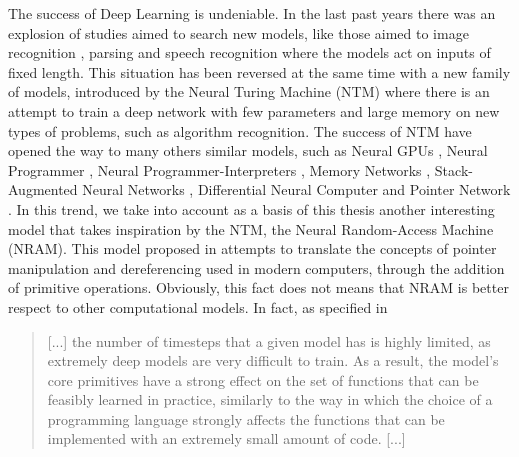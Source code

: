 The success of Deep Learning is undeniable. In the last past years there was an explosion of studies aimed to search new models, like those aimed to image recognition \cite{Krizhevsky2012ImageNetCW}, parsing \cite{Vinyals2015GrammarAA} and speech recognition \cite{Chan2015ListenAA} where the models act on inputs of fixed length. This situation has been reversed at the same time with a new family of models, introduced by the Neural Turing Machine (NTM) \cite{Graves2014NeuralTM} where there is an attempt to train a deep network with few parameters and large memory on new types of problems, such as algorithm recognition. The success of NTM have opened the way to many others similar models, such as Neural GPUs \cite{Kaiser2015NeuralGL}, Neural Programmer \cite{Neelakantan2015NeuralPI}, Neural Programmer-Interpreters \cite{Reed2015NeuralP}, Memory Networks \cite{Weston2014MemoryN}, Stack-Augmented Neural Networks \cite{Joulin2015InferringAP}, Differential Neural Computer \cite{Graves2016HybridCU} and Pointer Network \cite{Vinyals2015PointerN}.
\newline \newline
In this trend, we take into account as a basis of this thesis another interesting model that takes inspiration by the NTM, the Neural Random-Access Machine (NRAM). This model proposed in \cite{NRAM:2016} attempts to translate the concepts of pointer manipulation and dereferencing used in modern computers, through the addition of primitive operations. Obviously, this fact does not means that NRAM is better respect to other computational models. In fact, as specified in \cite{NRAM:2016}
\begin{quote}
[...] the number of timesteps that a given model has is highly limited, as extremely deep models are very difficult to train. As a result, the model’s core primitives have a strong effect on the set of functions that can be feasibly learned in practice, similarly to the way in which the choice of a programming language strongly affects the functions that can be implemented with an extremely small amount of code. [...]
\end{quote}

